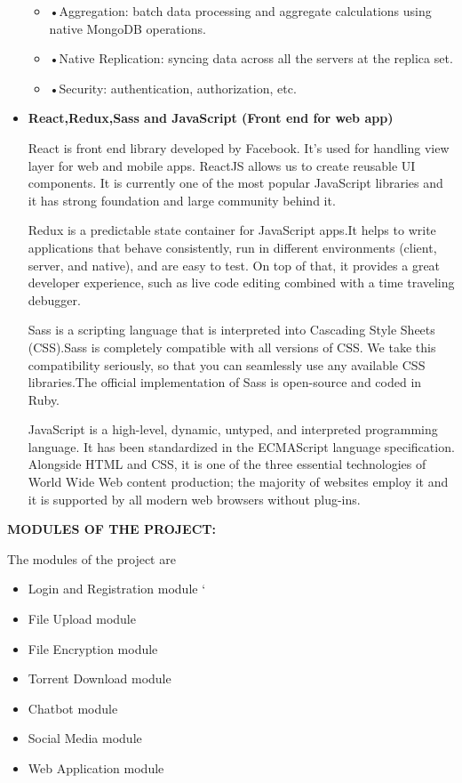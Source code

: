 \begin{itemize}
\begin{itemize}
\item •Aggregation: batch data processing and aggregate calculations using native MongoDB operations.

\item •Native Replication: syncing data across all the servers at the replica set.

\item •Security: authentication, authorization, etc.
\end{itemize}


\item	\textbf{React,Redux,Sass and JavaScript (Front end for web app) }

React is front end library developed by Facebook. It's used for handling view layer for web and mobile apps. ReactJS allows us to create reusable UI components. It is currently one of the most popular JavaScript libraries and it has strong foundation and large community behind it.

Redux is a predictable state container for JavaScript apps.It helps to write applications that behave consistently, run in different environments (client, server, and native), and are easy to test. On top of that, it provides a great developer experience, such as live code editing combined with a time traveling debugger.

Sass is a scripting language that is interpreted into Cascading Style Sheets 
  (CSS).Sass is completely compatible with all versions of CSS. We take this compatibility seriously, so that you can seamlessly use any available CSS libraries.The official implementation of Sass is open-source and coded in Ruby.

JavaScript is a high-level, dynamic, untyped, and interpreted programming language. It has been standardized in the ECMAScript language specification. Alongside HTML and CSS, it is one of the three essential technologies of World Wide Web content production; the majority of websites employ it and it is supported by all modern web browsers without plug-ins.

\end{itemize}




\textbf{MODULES OF THE PROJECT:}

The modules of the project are
\begin{itemize}

\item	Login and Registration module
`
\item	File Upload module

\item   File Encryption module

\item   Torrent Download module

\item	Chatbot module

\item	Social Media module

\item	Web Application module

\end{itemize}



